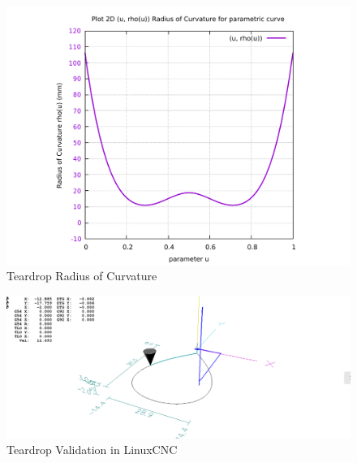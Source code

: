 \begin{figure}
	\caption     {Teardrop Radius of Curvature}
	\label{02-img-Teardrop Radius of Curvature.pdf}
	\includegraphics[width=1.00\textwidth]{Chap4/appendix/app-Teardrop/plots/02-img-Teardrop Radius of Curvature.pdf} 
\end{figure}	


\clearpage
\pagebreak

\begin{figure}
	\caption     {Teardrop Validation in LinuxCNC}
	\label{03-img-Teardrop-Validation-in-LinuxCNC.png}
	\includegraphics[width=1.00\textwidth]{Chap4/appendix/app-Teardrop/plots/03-img-Teardrop-Validation-in-LinuxCNC.png}
\end{figure}


